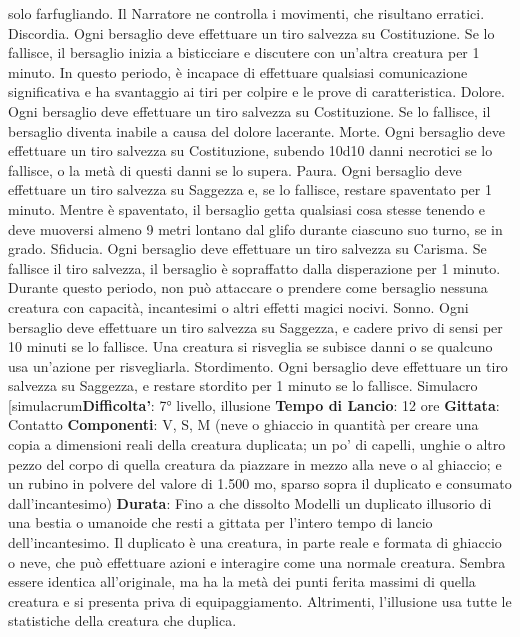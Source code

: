 \begin{multicols}{2}
solo farfugliando. Il Narratore ne controlla i movimenti, che
risultano erratici.
Discordia. Ogni bersaglio deve effettuare un tiro
salvezza su Costituzione. Se lo fallisce, il bersaglio
inizia a bisticciare e discutere con un’altra creatura per
1 minuto. In questo periodo, è incapace di effettuare
qualsiasi comunicazione significativa e ha svantaggio ai
tiri per colpire e le prove di caratteristica.
Dolore. Ogni bersaglio deve effettuare un tiro salvezza
su Costituzione. Se lo fallisce, il bersaglio diventa
inabile a causa del dolore lacerante.
Morte. Ogni bersaglio deve effettuare un tiro salvezza
su Costituzione, subendo 10d10 danni necrotici se lo
fallisce, o la metà di questi danni se lo supera.
Paura. Ogni bersaglio deve effettuare un tiro salvezza
su Saggezza e, se lo fallisce, restare spaventato per 1
minuto. Mentre è spaventato, il bersaglio getta qualsiasi
cosa stesse tenendo e deve muoversi almeno 9 metri
lontano dal glifo durante ciascuno suo turno, se in
grado.
Sfiducia. Ogni bersaglio deve effettuare un tiro
salvezza su Carisma. Se fallisce il tiro salvezza, il
bersaglio è sopraffatto dalla disperazione per 1 minuto.
Durante questo periodo, non può attaccare o prendere
come bersaglio nessuna creatura con capacità,
incantesimi o altri effetti magici nocivi.
Sonno. Ogni bersaglio deve effettuare un tiro salvezza
su Saggezza, e cadere privo di sensi per 10 minuti se lo
fallisce. Una creatura si risveglia se subisce danni o se
qualcuno usa un’azione per risvegliarla.
Stordimento. Ogni bersaglio deve effettuare un tiro
salvezza su Saggezza, e restare stordito per 1 minuto
se lo fallisce.
Simulacro
[simulacrum\textbf{Difficolta'}:
7° livello, illusione
\textbf{Tempo di Lancio}: 12 ore
\textbf{Gittata}: Contatto
\textbf{Componenti}: V, S, M (neve o ghiaccio in quantità per
creare una copia a dimensioni reali della creatura
duplicata; un po’ di capelli, unghie o altro pezzo del
corpo di quella creatura da piazzare in mezzo alla neve
o al ghiaccio; e un rubino in polvere del valore di 1.500
mo, sparso sopra il duplicato e consumato
dall’incantesimo)
\textbf{Durata}: Fino a che dissolto
Modelli un duplicato illusorio di una bestia o umanoide
che resti a gittata per l’intero tempo di lancio
dell’incantesimo. Il duplicato è una creatura, in parte
reale e formata di ghiaccio o neve, che può effettuare
azioni e interagire come una normale creatura. Sembra
essere identica all’originale, ma ha la metà dei punti
ferita massimi di quella creatura e si presenta priva di
equipaggiamento. Altrimenti, l’illusione usa tutte le
statistiche della creatura che duplica.

\end{multicols}

